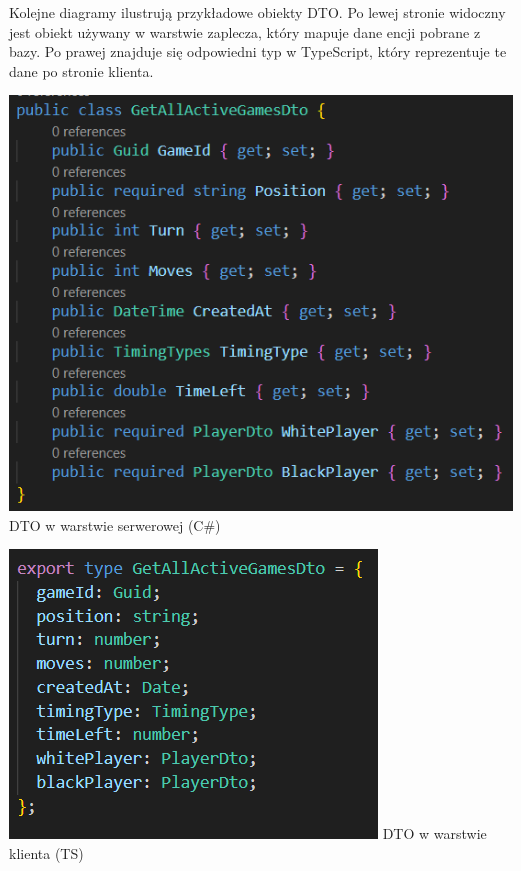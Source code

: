 \documentclass[12pt,a4paper]{article}
\begin{document}
\noindent
Kolejne diagramy ilustrują przykładowe obiekty DTO. Po lewej stronie widoczny jest obiekt używany w warstwie zaplecza, który mapuje dane encji pobrane z bazy. Po prawej znajduje się odpowiedni typ w TypeScript, który reprezentuje te dane po stronie klienta.

\vspace{1cm}
\begin{minipage}[t]{0.45\textwidth} 
    \vspace{0pt} 
    \centering 
    \includegraphics[width=\linewidth]{images/ex_dto_back.png} 
    DTO w warstwie serwerowej (C\#)
\end{minipage} 
\hfill 
\begin{minipage}[t]{0.45\textwidth} 
    \vspace{0pt} 
    \centering 
    \includegraphics[width=\linewidth]{images/ex_dto_front.png} 
    DTO w warstwie klienta (TS)
\end{minipage}
\end{document}

